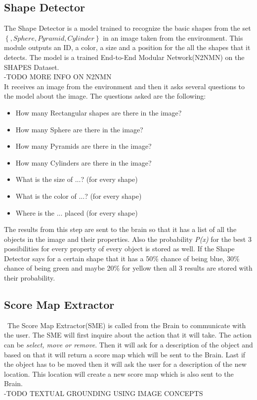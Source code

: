 \documentclass{article}
\begin{document}
     \subsection{Shape Detector}
     The Shape Detector is a model trained to recognize the basic shapes from the set $\left\{ , Sphere, Pyramid, Cylinder \right\}$ in an image taken from the environment. This module outputs an ID, a color, a size and a position for the all the shapes that it detects. The model is a trained End-to-End Modular Network(N2NMN) on the SHAPES Dataset.\\
     -TODO MORE INFO ON N2NMN\\
     It receives an image from the environment and then it asks several questions to the model about the image. The questions asked are the following:
     \begin{itemize}
     	\item How many Rectangular shapes are there in the image?
     	\item How many Sphere are there in the image?
     	\item How many Pyramids are there in the image?
     	\item How many Cylinders are there in the image?
     	\item What is the size of ...? (for every shape)
     	\item What is the color of ...? (for every shape)
     	\item Where is the ... placed (for every shape)
     \end{itemize}
 	 The results from this step are sent to the brain so that it has a list of all the objects in the image and their properties. Also the probability \textit{P(x)} for the best 3 possibilities for every property of every object is stored as well. If the Shape Detector says for a certain shape that it has a 50\% chance of being blue, 30\% chance of being green and maybe 20\% for yellow then all 3 results are stored with their probability.
     \subsection{Score Map Extractor}\
     The Score Map Extractor(SME) is called from the Brain to communicate with the user. The SME will first inquire about the action that it will take. The action can be \textit{select, move or remove}. Then it will ask for a description of the object and based on that it will return a score map which will be sent to the Brain. Last if the object has to be moved then it will ask the user for a description of the new location. This location will create a new score map which is also sent to the Brain.\\
     -TODO TEXTUAL GROUNDING USING IMAGE CONCEPTS\\
    
\end{document}
